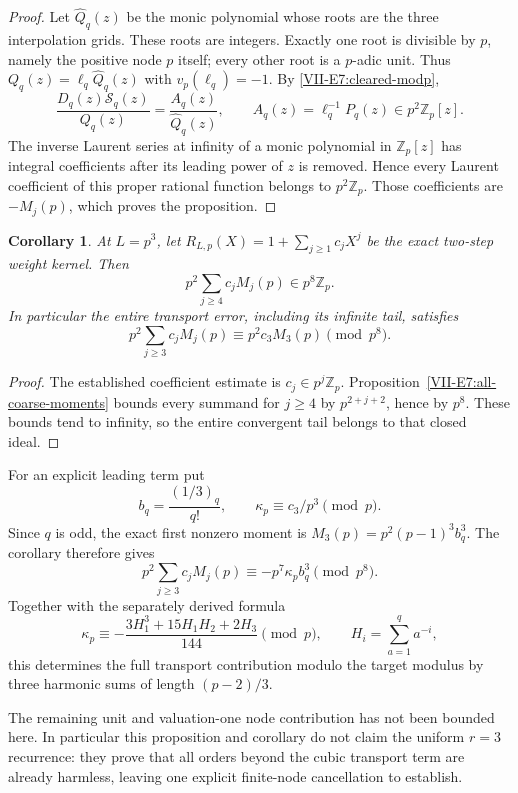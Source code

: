 \documentclass[11pt,letterpaper]{article}
\newtheorem{corollary}[theorem]{Corollary}
\numberwithin{equation}{section}
\begin{document}
\begin{proof}
Let $\widehat Q_q(z)$ be the monic polynomial whose roots are the
three interpolation grids. These roots are integers. Exactly one
root is divisible by $p$, namely the positive node $p$ itself;
every other root is a $p$-adic unit. Thus
$Q_q(z)=\ell_q\widehat Q_q(z)$ with $v_p(\ell_q)=-1$.
By \eqref{VII-E7:cleared-modp},
\[
 \frac{D_q(z)\mathcal S_q(z)}{Q_q(z)}
 =\frac{A_q(z)}{\widehat Q_q(z)},\qquad
 A_q(z)=\ell_q^{-1}P_q(z)\in p^2\mathbb Z_p[z].
\]
The inverse Laurent series at infinity of a monic polynomial in
$\mathbb Z_p[z]$ has integral coefficients after its leading power
of $z$ is removed. Hence every Laurent coefficient of this proper
rational function belongs to $p^2\mathbb Z_p$.
Those coefficients are $-M_j(p)$, which proves the proposition.
\end{proof}

\begin{corollary}\label{VII-E7:r3tail}
At $L=p^3$, let $R_{L,p}(X)=1+\sum_{j\ge1}c_jX^j$ be the exact
two-step weight kernel. Then
\[
 p^2\sum_{j\ge4}c_jM_j(p)\in p^8\mathbb Z_p.
\]
In particular the entire transport error, including its infinite
tail, satisfies
\[
 p^2\sum_{j\ge3}c_jM_j(p)
 \equiv p^2c_3M_3(p)\pmod{p^8}.
\]
\end{corollary}
\begin{proof}
The established coefficient estimate is $c_j\in p^j\mathbb Z_p$.
Proposition~\ref{VII-E7:all-coarse-moments} bounds every summand for
$j\ge4$ by $p^{2+j+2}$, hence by $p^8$. These bounds tend to
infinity, so the entire convergent tail belongs to that closed ideal.
\end{proof}

For an explicit leading term put
\[
 b_q=\frac{(1/3)_q}{q!},\qquad
 \kappa_p\equiv c_3/p^3\pmod p.
\]
Since $q$ is odd, the exact first nonzero moment is
$M_3(p)=p^2(p-1)^3b_q^3$. The corollary therefore gives
\[
 \boxed{\quad
 p^2\sum_{j\ge3}c_jM_j(p)
 \equiv-p^7\kappa_pb_q^3\pmod{p^8}.
 \quad}
\]
Together with the separately derived formula
\[
 \kappa_p\equiv-
 \frac{3H_1^3+15H_1H_2+2H_3}{144}\pmod p,
 \qquad H_i=\sum_{a=1}^{q}a^{-i},
\]
this determines the full transport contribution modulo the target
modulus by three harmonic sums of length $(p-2)/3$.

The remaining unit and valuation-one node contribution has not been
bounded here. In particular this proposition and corollary do not
claim the uniform $r=3$ recurrence: they prove that all orders beyond
the cubic transport term are already harmless, leaving one explicit
finite-node cancellation to establish.
\end{document}
